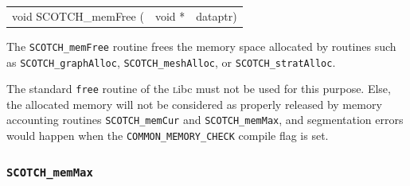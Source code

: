 \begin{itemize}
\progsyn

{\tt\begin{tabular}{l@{}ll}
void SCOTCH\_memFree ( & void * & dataptr)
\end{tabular}}

\progdes

The {\tt SCOTCH\_memFree} routine frees the memory space allocated
by routines such as {\tt SCOTCH\_\lbt graph\lbt Alloc},
{\tt SCOTCH\_\lbt mesh\lbt Alloc}, or
{\tt SCOTCH\_\lbt strat\lbt Alloc}.

The standard {\tt free} routine of the {\textsc libc} must not be
used for this purpose. Else, the allocated memory will not be
considered as properly released by memory accounting routines
{\tt SCOTCH\_\lbt mem\lbt Cur} and {\tt SCOTCH\_\lbt mem\lbt Max},
and segmentation errors would happen when the
{\tt COMMON\_\lbt MEMORY\_\lbt CHECK} compile flag is set.
\end{itemize}

\subsubsection{{\tt SCOTCH\_memMax}}

